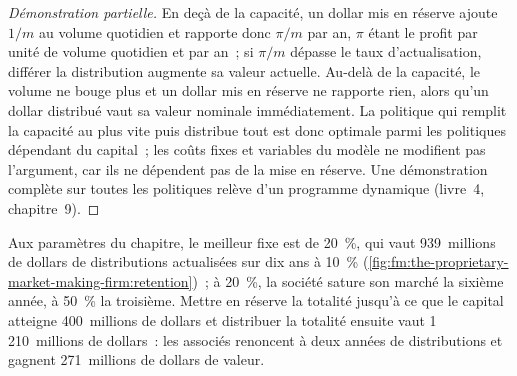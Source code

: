 \begin{proof}[Démonstration partielle]
En deçà de la capacité, un dollar mis en réserve ajoute $1/m$ au volume quotidien et rapporte donc $\pi/m$ par an, $\pi$ étant le profit par unité de volume quotidien et par an~; si $\pi/m$ dépasse le taux
d'actualisation, différer la distribution augmente sa valeur actuelle. Au-delà de la capacité, le volume ne bouge plus et un dollar mis en réserve
ne rapporte rien, alors qu'un dollar distribué vaut sa valeur nominale immédiatement. La politique qui remplit la capacité au plus vite puis
distribue tout est donc optimale parmi les politiques dépendant du capital~; les coûts fixes et variables du modèle ne modifient pas l'argument, car
ils ne dépendent pas de la mise en réserve. Une démonstration complète sur toutes les politiques relève d'un programme dynamique (livre~4, chapitre~9).
\end{proof}

Aux paramètres du chapitre, le meilleur  fixe est de 20~\%, qui vaut 939~millions de dollars de distributions actualisées sur dix ans à 10~\%
(\cref{fig:fm:the-proprietary-market-making-firm:retention})~; à 20~\%, la société sature son marché la sixième année, à 50~\% la troisième. Mettre en réserve la totalité
jusqu'à ce que le capital atteigne 400~millions de dollars et distribuer la totalité ensuite vaut 1\,210~millions de dollars~: les associés renoncent à deux années de distributions et
gagnent 271~millions de dollars de valeur.

\begin{omfigure}

\label{fig:fm:the-proprietary-market-making-firm:retention}
\end{omfigure}


